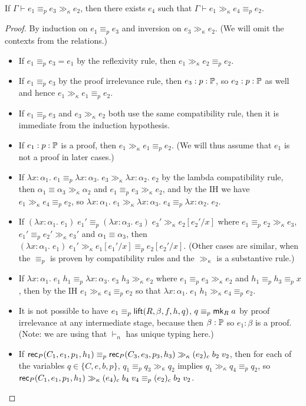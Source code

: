 \begin{lemma}\label{gg_compat}
If $\Gamma\vdash e_1\equiv_p e_3\gg_\kappa e_2$, then there exists $e_4$ such that $\Gamma\vdash e_1\gg_\kappa e_4\equiv_p e_2$.
\end{lemma}
\begin{proof}
By induction on $e_1\equiv_p e_3$ and inversion on $e_3\gg_\kappa e_2$. (We will omit the contexts from the relations.)
\begin{itemize}
\item If $e_1\equiv_p e_3=e_1$ by the reflexivity rule, then $e_1\gg_\kappa e_2\equiv_p e_2$.
\item If $e_1\equiv_p e_3$ by the proof irrelevance rule, then $e_3:p:\P$, so $e_2:p:\P$ as well and hence $e_1\gg_\kappa e_1\equiv_p e_2$.
\item If $e_1\equiv_p e_3$ and $e_3\gg_\kappa e_2$ both use the same compatibility rule, then it is immediate from the induction hypothesis.
\item If $e_1:p:\P$ is a proof, then $e_1\gg_\kappa e_1\equiv_p e_2$. (We will thus assume that $e_1$ is not a proof in later cases.)
\item If $\lambda x:\alpha_1.\;e_1\equiv_p\lambda x:\alpha_3.\;e_3\gg_\kappa\lambda x:\alpha_2.\;e_2$ by the lambda compatibility rule, then $\alpha_1\equiv\alpha_3\gg_\kappa\alpha_2$ and $e_1\equiv_p e_3\gg_\kappa e_2$, and by the IH we have $e_1\gg_\kappa e_4\equiv_p e_2$, so $\lambda x:\alpha_1.\;e_1\gg_\kappa\lambda x:\alpha_3.\;e_4\equiv_p\lambda x:\alpha_2.\;e_2$.
\item If $(\lambda x:\alpha_1.\;e_1)\;e_1'\equiv_p(\lambda x:\alpha_3.\;e_3)\;e_3'\gg_\kappa e_2[e_2'/x]$ where $e_1\equiv_p e_2\gg_\kappa e_3$, $e_1'\equiv_p e_2'\gg_\kappa e_3'$ and $\alpha_1\equiv\alpha_3$, then $(\lambda x:\alpha_1.\;e_1)\;e_1'\gg_\kappa e_1[e_1'/x]\equiv_p e_2[e_2'/x]$. (Other cases are similar, when the $\equiv_p$ is proven by compatibility rules and the $\gg_\kappa$ is a substantive rule.)
\item If $\lambda x:\alpha_1.\;e_1\;h_1\equiv_p\lambda x:\alpha_3.\;e_3\;h_3\gg_\kappa e_2$ where $e_1\equiv_p e_3\gg_\kappa e_2$ and $h_1\equiv_p h_3\equiv_p x$, then by the IH $e_1\gg_\kappa e_4\equiv_p e_2$ so that $\lambda x:\alpha_1.\;e_1\;h_1\gg_\kappa e_4\equiv_p e_2$.
\item It is not possible to have $e_1\equiv_p\lift(R,\beta,f,h,q)$, $q\equiv_p \mk_R\;a$ by proof irrelevance at any intermediate stage, because then $\beta:\P$ so $e_1:\beta$ is a proof. (Note: we are using that $\vdash_n$ has unique typing here.)
\item If $\rec_P(C_1,e_1,p_1,h_1)\equiv_p \rec_P(C_3,e_3,p_3,h_3)\gg_\kappa (e_2)_c\;b_2\;v_2$, then for each of the variables $q\in\{C,e,b,p\}$, $q_1\equiv_p q_3\gg_\kappa q_2$ implies $q_1\gg_\kappa q_4\equiv_p q_2$, so $\rec_P(C_1,e_1,p_1,h_1)\gg_\kappa (e_4)_c\;b_4\;v_4\equiv_p (e_2)_c\;b_2\;v_2$.
\end{itemize}
\end{proof}
